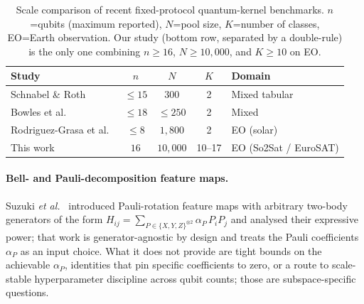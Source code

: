 \documentclass[pdflatex,sn-mathphys]{sn-jnl}
\theoremstyle{plain}
\theoremstyle{remark}
\theoremstyle{definition}
\begin{document}
\begin{table}[htbp]
\caption{Scale comparison of recent fixed-protocol quantum-kernel benchmarks. $n$=qubits (maximum reported), $N$=pool size, $K$=number of classes, EO=Earth observation. Our study (bottom row, separated by a double-rule) is the only one combining $n\ge 16$, $N\ge 10{,}000$, and $K\ge 10$ on EO.}
\label{tab:scale-compare}
\footnotesize
\setlength{\tabcolsep}{3pt}
\begin{tabular}{@{}lcccl@{}}
\toprule
Study & $n$ & $N$ & $K$ & Domain \\
\midrule
Schnabel \& Roth \cite{schnabel2025}           & $\le 15$ & $300$        & 2     & Mixed tabular \\
Bowles et al.\ \cite{bowles2024}               & $\le 18$ & $\le 250$    & 2     & Mixed \\
Rodriguez-Grasa et al.\ \cite{rodriguez2025}   & $\le 8$  & $1{,}800$    & 2     & EO (solar) \\
\midrule
This work                                       & $16$     & $10{,}000$   & 10--17 & EO (So2Sat / EuroSAT) \\
\bottomrule
\end{tabular}
\end{table}

\paragraph{Bell- and Pauli-decomposition feature maps.}
Suzuki \emph{et al.}\ \cite{suzuki2020} introduced Pauli-rotation feature maps with arbitrary two-body generators of the form $H_{ij}=\sum_{P\in\{X,Y,Z\}^{\otimes 2}}\alpha_P\,P_iP_j$ and analysed their expressive power; that work is generator-agnostic by design and treats the Pauli coefficients $\alpha_P$ as an input choice.  What it does not provide are tight bounds on the achievable $\alpha_P$, identities that pin specific coefficients to zero, or a route to scale-stable hyperparameter discipline across qubit counts; those are subspace-specific questions.
\end{document}
